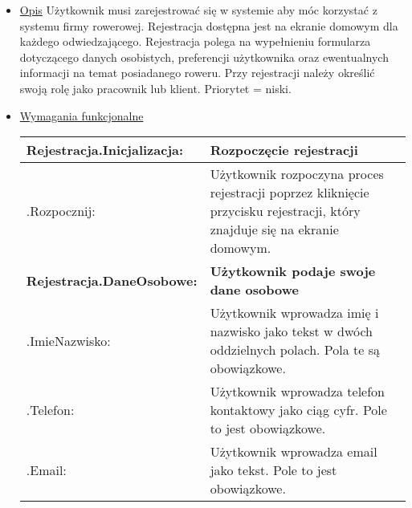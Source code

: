 \documentclass[a4paper,20pt]{article}
\begin{document}
\begin{itemize}
\item \underline{Opis} 
\newline
\newline
Użytkownik musi zarejestrować się w systemie aby móc korzystać z systemu firmy rowerowej. Rejestracja dostępna jest na ekranie domowym dla każdego odwiedzającego. Rejestracja polega na wypełnieniu formularza dotyczącego danych osobistych, preferencji użytkownika oraz ewentualnych informacji na temat posiadanego roweru. Przy rejestracji należy określić swoją rolę jako pracownik lub klient. Priorytet = niski.
\newline

\item \underline{Wymagania funkcjonalne}

\begin{center}
\begin{tabularx}{\textwidth}[H]{XX}
\arrayrulecolor{black}\hline
\textbf{Rejestracja.Inicjalizacja:} & \textbf{Rozpoczęcie rejestracji} \\
\hline
\quad .Rozpocznij: & 
\begin{minipage}[t]{\linewidth}%
Użytkownik rozpoczyna proces rejestracji poprzez kliknięcie przycisku rejestracji, który znajduje się na ekranie domowym.
\end{minipage}\\

\arrayrulecolor{black}\hline

\arrayrulecolor{black}\hline
\textbf{Rejestracja.DaneOsobowe:} & \textbf{Użytkownik podaje swoje dane osobowe} \\
\hline

\quad .ImieNazwisko: &
\begin{minipage}[t]{\linewidth}%
Użytkownik wprowadza imię i nazwisko jako tekst w dwóch oddzielnych polach. Pola te są obowiązkowe.
\end{minipage}\\


\quad .Telefon: &
\begin{minipage}[t]{\linewidth}%
Użytkownik wprowadza telefon kontaktowy jako ciąg cyfr. Pole to jest obowiązkowe. 
\end{minipage}\\


\quad .Email: &
\begin{minipage}[t]{\linewidth}%
Użytkownik wprowadza email jako tekst. Pole to jest obowiązkowe. 
\end{minipage}\\



\end{tabularx}
\end{center}
\end{itemize}
\end{document}

